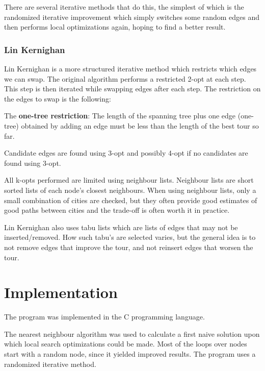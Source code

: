 \documentclass[paper=a4, fontsize=11pt,numbers=endperiod]{scrartcl} %
\numberwithin{equation}{section} %
\numberwithin{figure}{section} %
\numberwithin{table}{section} %
\begin{document}
There are several iterative methods that do this, the simplest of which is the randomized iterative improvement which simply switches some random edges and then performs local optimizations again, hoping to find a better result.

\subsubsection{Lin Kernighan}
Lin Kernighan \cite{LK} is a more structured iterative method which restricts which edges we can swap. 
The original algorithm performs a restricted 2-opt at each step. This step is then iterated while swapping edges after each step. The restriction on the edges to swap is the following:

The \textbf{one-tree restriction}:
The length of the spanning tree plus one edge (one-tree) obtained by adding an edge must be less than the length of the best tour so far. \cite{LK2}

Candidate edges are found using 3-opt and possibly 4-opt if no candidates are found using 3-opt.

All k-opts performed are limited using neighbour lists. Neighbour lists are short sorted lists of each node's closest neighbours. When using neighbour lists, only a small combination of cities are checked, but they often provide good estimates of good paths between cities and the trade-off is often worth it in practice.

Lin Kernighan also uses tabu lists which are lists of edges that may not be inserted/removed. How such tabu's are selected varies, but the general idea is to not remove edges that improve the tour, and not reinsert edges that worsen the tour.




\section{Implementation}
The program was implemented in the C programming language.

The nearest neighbour algorithm was used to calculate a first naive solution upon which local search optimizations could be made.
Most of the loops over nodes start with a random node, since it yielded improved results.
The program uses a randomized iterative method.
\end{document}
